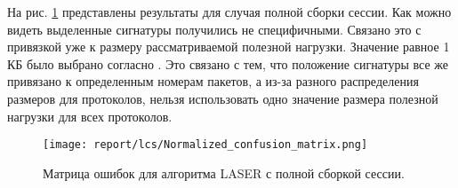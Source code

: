 \begin{table}[th!]
    \caption{Результаты классификации для алгоритма LASER с частичной сборкой сессии.}
    \label{report:laser_reasm}
    \centering
\end{table}

На рис. \ref{plt:lcs} представлены результаты для случая полной сборки сессии.
Как можно видеть выделенные сигнатуры получились не специфичными.
Связано это с привязкой уже к размеру рассматриваемой полезной нагрузки.
Значение равное 1 КБ было выбрано согласно \cite{ye2009autosig}.
Это связано с тем, что положение сигнатуры все же привязано к определенным номерам пакетов,
а из-за разного распределения размеров для протоколов, нельзя использовать одно значение размера полезной нагрузки для всех протоколов.

\begin{figure}[H]
    \begin{center}
        \texttt{[image: report/lcs/Normalized\_confusion\_matrix.png]}
        \caption{Матрица ошибок для алгоритма LASER с полной сборкой сессии.}
        \label{plt:lcs}
    \end{center}
\end{figure}

\newpage
